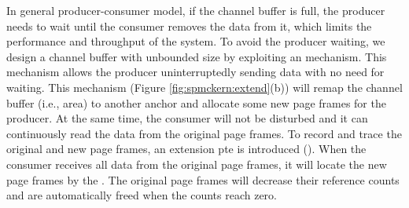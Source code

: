 In general producer-consumer model, if the channel buffer is full, the producer needs to wait until the consumer removes the data from it, which limits the performance and throughput of the system.
To avoid the producer waiting, we design a channel buffer with unbounded size  by exploiting an  mechanism\cite{zhang13lazy}.
This mechanism allows the producer uninterruptedly sending data with no need for waiting.
This  mechanism (Figure  \ref{fig:spmckern:extend}(b)) will remap the channel buffer (i.e.,  area) to another anchor and allocate some new page frames for the producer. 
At the same time, the consumer will not be disturbed and it can continuously read the data from the original page frames.
To record and trace the original  and  new page frames, an extension pte is introduced ().
When the consumer receives all data from the original page frames, it will locate the new page frames by the .
The original page frames will decrease their reference counts and are automatically freed  when the counts reach zero.







